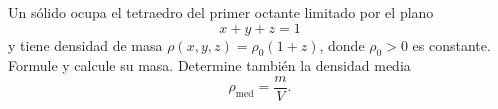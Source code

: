 Un sólido ocupa el tetraedro del primer octante limitado por el plano
\[
x+y+z=1
\]
y tiene densidad de masa $\rho(x,y,z)=\rho_0(1+z)$, donde $\rho_0>0$ es constante. Formule y calcule su masa. Determine también la densidad media
\[
\rho_{\mathrm{med}}=\frac{m}{V}.
\]
